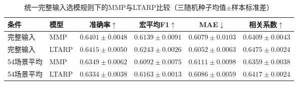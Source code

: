 \begin{table}[H]
\centering\small\setlength{\tabcolsep}{4pt}
\caption{统一完整输入选模规则下的MMP与LTARP比较（三随机种子均值$\pm$样本标准差）}
\label{tab:q2_main}
\begin{tabular}{llcccc}
\toprule
条件 & 模型 & 准确率$\uparrow$ & 宏平均F1$\uparrow$ & MAE$\downarrow$ & 相关系数$\uparrow$\\
\midrule
完整输入 & MMP & $0.6401\pm0.0048$ & $0.6139\pm0.0091$ & $0.6079\pm0.0103$ & $0.6409\pm0.0043$\\
完整输入 & LTARP & $0.6415\pm0.0050$ & $0.6243\pm0.0026$ & $0.6052\pm0.0063$ & $0.6475\pm0.0024$\\
\addlinespace
54场景平均 & MMP & $0.6349\pm0.0062$ & $0.6092\pm0.0075$ & $0.6111\pm0.0098$ & $0.6359\pm0.0038$\\
54场景平均 & LTARP & $0.6334\pm0.0038$ & $0.6163\pm0.0013$ & $0.6086\pm0.0059$ & $0.6417\pm0.0024$\\
\bottomrule
\end{tabular}
\end{table}